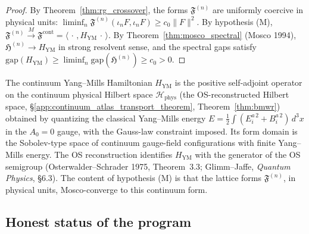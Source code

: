 \begin{proof}
By Theorem~\ref{thm:rg_crossover}, the forms
$\mathfrak{F}^{(n)}$ are uniformly coercive in physical units:
$\liminf_{n}\mathfrak{F}^{(n)}(\iota_{n}F,\iota_{n}F)\ge
c_{0}\|F\|^{2}$. By hypothesis (M),
$\mathfrak{F}^{(n)}\xrightarrow{M}\mathfrak{F}^{\mathrm{cont}}
=\langle\,\cdot\,,H_{\mathrm{YM}}\,\cdot\,\rangle$. By
Theorem~\ref{thm:mosco_spectral} (Mosco 1994),
$\mathfrak{H}^{(n)}\to H_{\mathrm{YM}}$ in strong resolvent sense,
and the spectral gaps satisfy
$\mathrm{gap}(H_{\mathrm{YM}})\ge
\liminf_{n}\mathrm{gap}(\mathfrak{H}^{(n)})\ge c_{0}>0$.
\end{proof}

\begin{remark}
\label{rem:ym_hamiltonian}
The continuum Yang--Mills Hamiltonian $H_{\mathrm{YM}}$ is the
positive self-adjoint operator on the continuum physical Hilbert
space $\mathcal{H}_{\mathrm{phys}}$ (the OS-reconstructed Hilbert
space, \S\ref{app:continuum_atlas_transport_theorem},
Theorem~\ref{thm:bmwr}) obtained by quantizing the classical
Yang--Mills energy
$E=\tfrac{1}{2}\int(E_{i}^{a\,2}+B_{i}^{a\,2})\,d^{3}x$ in the
$A_{0}=0$ gauge, with the Gauss-law constraint imposed. Its form
domain is the Sobolev-type space of continuum gauge-field
configurations with finite Yang--Mills energy. The OS
reconstruction identifies $H_{\mathrm{YM}}$ with the generator of
the OS semigroup (Osterwalder--Schrader 1975, Theorem~3.3;
Glimm--Jaffe, \emph{Quantum Physics}, \S6.3). The content of
hypothesis (M) is that the lattice forms
$\mathfrak{F}^{(n)}$, in physical units, Mosco-converge to this
continuum form.
\end{remark}

\subsection{Honest status of the program}
\label{ssec:spf_status}


